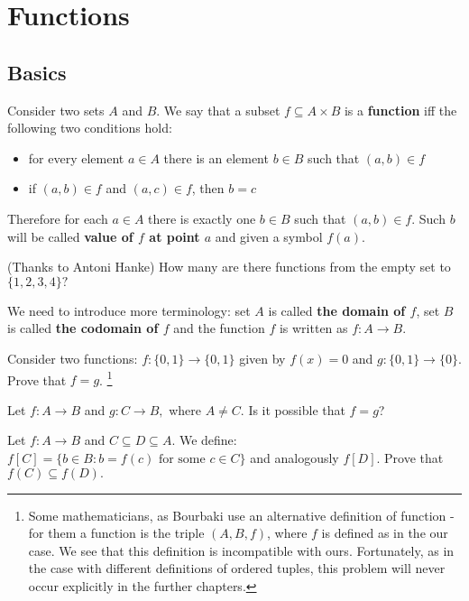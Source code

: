 \section{Functions}
\label{sec:intro_to_functions}

\subsection{Basics}
\noindent Consider two sets $A$ and $B$. We say that a subset $f\subseteq A\times B$ is a \textbf{function}
iff the following two conditions hold:
\begin{itemize}
	\item for every element $a\in A$ there is an element $b\in B$ such that $(a,b)\in f$
	\item if $(a,b)\in f$ and $(a,c)\in f$, then $b=c$
\end{itemize}
Therefore for each $a\in A$ there is exactly one $b\in B$ such that $(a,b)\in f$. Such $b$ will be called
\textbf{value of $f$ at point $a$} and given a symbol $f(a).$
\begin{prob}
	(Thanks to Antoni Hanke) How many are there functions from the empty set to $\{1,2,3,4\}?$
\end{prob}

We need to introduce more terminology: set $A$ is called \textbf{the domain of $f$}, set $B$ is called
\textbf{the codomain of $f$} and the function $f$ is written as $f: A\to B$.

\begin{prob}
	Consider two functions: $f:\{0, 1\}\to \{0,1\}$ given by $f(x)=0$ and $g:\{0,1\}\to\{0\}$.
	Prove that $f=g$.
	\footnote{Some mathematicians, as Bourbaki use an alternative definition of function - for them
	a function is the triple $(A,B,f)$, where $f$ is defined as in the our case. We see that this definition
	is incompatible with ours. Fortunately, as in the case with different definitions of ordered tuples,
	this problem will never occur explicitly in the further chapters.}
\end{prob}

\begin{prob}
	Let $f:A\to B$ and $g: C\to B,$ where $A\neq C$. Is it possible that $f=g$?
\end{prob}

\begin{prob}
	Let $f: A\to B$ and $C\subseteq D\subseteq A$. We define: $f[C] = \{b\in B : b=f(c) \text{ for some }c\in C \}$ and analogously $f[D]$. Prove that
	$f(C)\subseteq f(D).$
\end{prob}

